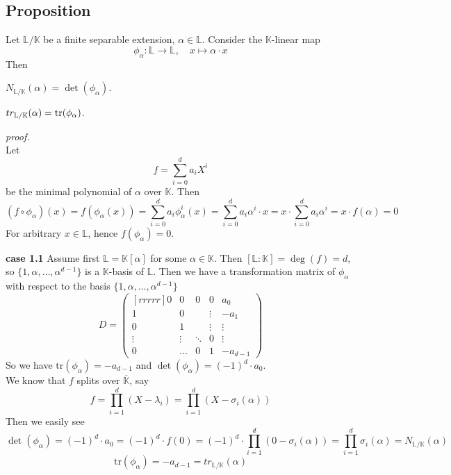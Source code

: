 \documentclass[12pt]{book}
\begin{document}
\begin{spacing}{1.3}
\subsection{Proposition} %
Let $\mathbb{L}/\mathbb{K}$ be a finite separable extension, $\alpha \in \mathbb{L}$. Consider the $\mathbb{K}$-linear map
$$ \phi_{\alpha}: \mathbb{L} \longrightarrow \mathbb{L}, \quad x \mapsto \alpha \cdot x$$
Then
\begin{compactenum}
\item $N_{\mathbb{L}/\mathbb{K}}(\alpha)=\det(\phi_{\alpha})$.
\item $tr_{\mathbb{L}/\mathbb{K}}(\alpha)=\rm{tr}(\phi_{\alpha})$.
\end{compactenum}
\textit{proof.}\\
Let $$f=\sum_{i=0}^d a_i X^{i}$$ be the minimal polynomial of $\alpha$ over $\mathbb{K}$. Then
$$\left(f \circ \phi_{\alpha}\right)(x)=f\left(\phi_{\alpha}(x)\right)=\sum_{i=0}^d a_i \phi_{\alpha}^{i}(x)=\sum_{i=0}^d a_i \alpha^{i} \cdot x = x \cdot \sum_{i=0}^d a_i \alpha^{i} = x \cdot f(\alpha)=0$$
For arbitrary $x \in \mathbb{L}$, hence $f(\phi_{\alpha})=0$.
\begin{compactitem}
\item[\textbf{case 1.1}] Assume first $\mathbb{L}=\mathbb{K}[\alpha]$ for some $\alpha \in \mathbb{K}$. Then $[\mathbb{L}:\mathbb{K}]= \deg(f)=d$, so $\{1, \alpha, \ldots, \alpha^{d-1}\}$ is a $\mathbb{K}$-basis of $\mathbb{L}$. Then we have a transformation matrix of $\phi_{\alpha}$ with respect to the basis $\{1, \alpha, \ldots, \alpha^{d-1}\}$\\
$$D=\begin{pmatrix}[rrrrr] 0 & 0 & 0 & 0 & a_0 \\ 1 & 0 && \vdots & -a_1 \\ 0 & 1 & & \vdots &  \vdots \\ \vdots & \vdots & \ddots & 0 & \vdots \\ 0 &  \ldots & 0 & 1 & -a_{d-1} \end{pmatrix}$$
So we have $\textrm{tr}(\phi_{\alpha})=-a_{d-1}$ and $\det(\phi_{\alpha})=(-1)^d \cdot a_0$.\\
We know that $f$ splits over $\overline{\mathbb{K}}$, say $$f=\prod_{i=1}^d (X-\lambda_i)=\prod_{i=1}^d \left(X-\sigma_i(\alpha)\right)$$
Then we easily see
$$\det(\phi_{\alpha})=(-1)^d \cdot a_0=(-1)^d \cdot f(0)=(-1)^d \cdot \prod_{i=1}^d \left(0-\sigma_i(\alpha)\right)=\prod_{i=1}^d \sigma_i(\alpha)=N_{\mathbb{L}/\mathbb{K}}(\alpha)$$
$$\textrm{tr}(\phi_{\alpha})=-a_{d-1}=tr_{\mathbb{L}/\mathbb{K}}(\alpha)$$

\end{compactitem}
\end{spacing}
\end{document}
